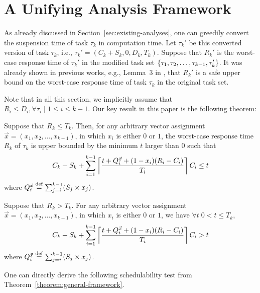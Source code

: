 \section{A Unifying Analysis Framework}
\label{sec:analysis}


As already discussed in Section~\ref{sec:existing-analyses}, one can greedily convert the suspension time of task $\tau_k$ in computation time. Let $\tau_k'$ be this converted version of task $\tau_k$, i.e., $\tau_k' = (C_k + S_k, 0, D_k, T_k)$.  Suppose that $R_k'$ is the worst-case response time of $\tau_k'$ in the modified task set $\left\{{\tau_1, \tau_2, \ldots, \tau_{k-1}, \tau_k'}\right\}$. It was already shown in previous works, e.g., Lemma~3 in
\cite{Liu_2014}, that $R_k'$ is a safe upper bound on the worst-case response time of task $\tau_k$ in the original task set.

Note that in all this section, we implicitly assume that $R_i
\leq D_i, \forall \tau_i \mid 1 \leq i \leq k-1$.  Our key result in
this paper is the following theorem:

\begin{theorem}
   \label{theorem:general-framework}
   Suppose that $R_k \leq T_k$. Then, for any arbitrary vector assignment $\vec{x} = (x_1, x_2, \ldots, x_{k-1})$, in which $x_i$ is either $0$ or $1$, the worst-case
   response time $R_k$ of $\tau_k$ is upper bounded by the minimum $t$ larger than $0$ such that 
   {\small \begin{equation} \label{eq:TDA-suspension-tighter0} 
       C_k + S_k + \sum_{i=1}^{k-1}\ceiling{\frac{t+Q_i^{\vec{x}}+(1-x_i)(R_i-C_i)}{T_i}} C_i \leq t
     \end{equation}}where $Q_i^{\vec{x}} \stackrel{\mathrm{def}}{=} \sum_{j=i}^{k-1} (S_j \times x_j)$.
 \end{theorem} 
\begin{theorem}
   \label{theorem:general-framework-not-feasible}
   Suppose that $R_k > T_k$. For any arbitrary vector assignment
   $\vec{x} = (x_1, x_2, \ldots, x_{k-1})$, in which $x_i$ is either
   $0$ or $1$,  we have $\forall t | 0 < t \leq T_k$,
   {\small \begin{equation*}
       C_k + S_k + \sum_{i=1}^{k-1}\left\lceil{\frac{t+Q_i^{\vec{x}}+(1-x_i)(R_i-C_i)}{T_i}}\right\rceil C_i > t
     \end{equation*}}where $Q_i^{\vec{x}} \stackrel{\mathrm{def}}{=} \sum_{j=i}^{k-1} (S_j \times x_j)$.
 \end{theorem} 
 One can directly derive the
 following schedulability test from Theorem~\ref{theorem:general-framework}.

